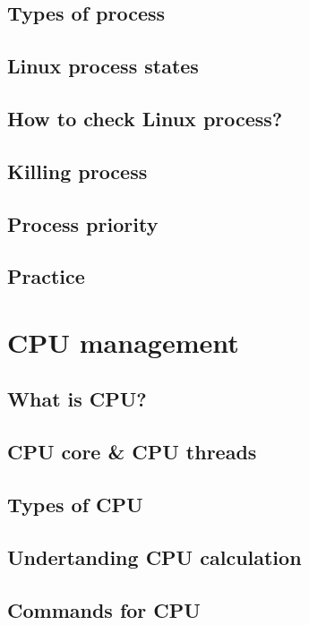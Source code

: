 \documentclass[14pt,fleqn]{extbook} %
\begin{document}
\subsection{Types of process}

\subsection{Linux process states}

\subsection{How to check Linux process?}

\subsection{Killing process}

\subsection{Process priority}

\subsection{Practice}

\section{CPU management}

\subsection{What is CPU?}

\subsection{CPU core \& CPU threads}

\subsection{Types of CPU}

\subsection{Undertanding CPU calculation}

\subsection{Commands for CPU}

\end{document}
